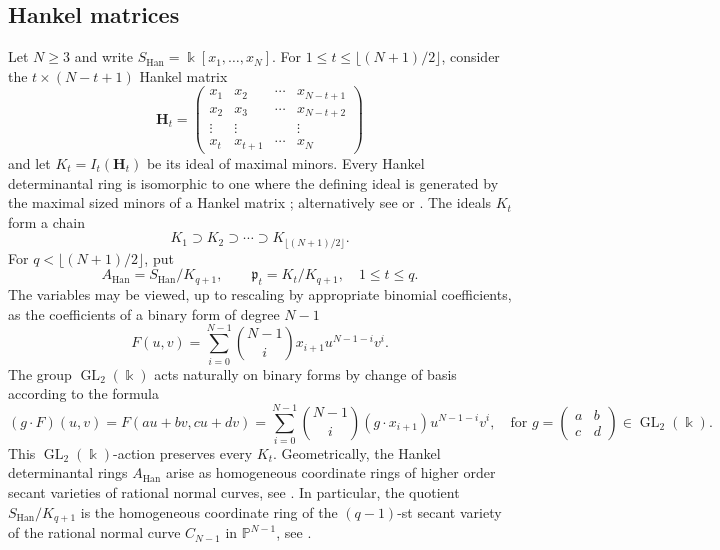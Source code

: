 \documentclass[11pt,reqno]{amsart}
\numberwithin{equation}{subsection}
\theoremstyle{definition}
\theoremstyle{remark}
\DeclareMathOperator{\GL}{GL}
\newcommand{\kfield}{\Bbbk}
\newcommand{\fp}{\mathfrak p}
\begin{document}
\subsection{Hankel matrices}

Let $N\ge3$ and write $S_{\mathrm{Han}}=\kfield[x_1,\ldots,x_N]$.  For
$1\le t\le\lfloor(N+1)/2\rfloor$, consider the $t\times(N-t+1)$ Hankel
matrix
\begin{equation}\label{eq:hankel-matrix}
 \mathbf H_t=
 \begin{pmatrix}
 x_1&x_2&\cdots&x_{N-t+1}\\
 x_2&x_3&\cdots&x_{N-t+2}\\
 \vdots&\vdots&&\vdots\\
 x_t&x_{t+1}&\cdots&x_N
 \end{pmatrix}
\end{equation}
and let $K_t=I_t(\mathbf H_t)$ be its ideal of maximal minors. Every Hankel determinantal ring
is isomorphic to one where the defining ideal is generated by the maximal sized
minors of a Hankel matrix \cite[Lemma 2.3]{GrusonPeskine1982}; alternatively see \cite[Proposition 7]{Watanabe1997Hankel} or \cite[Corollary 2.2(b)]{ConcaHankel}. The
ideals $K_t$ form a chain
\[
 K_1\supset K_2\supset\cdots\supset
 K_{\lfloor(N+1)/2\rfloor}.
\]
For $q<\lfloor(N+1)/2\rfloor$, put
\begin{equation}\label{eq:hankel-quotient}
 A_{\mathrm{Han}}=S_{\mathrm{Han}}/K_{q+1},
 \qquad
 \fp_t=K_t/K_{q+1},\quad1\le t\le q.
\end{equation}
The variables may be viewed, up to  rescaling by appropriate  binomial coefficients, as the
coefficients of a binary form of degree $N-1$ 
\[
F(u,v)
=
\sum_{i=0}^{N-1}\binom{N-1}{i}x_{i+1} u^{N-1-i}v^i.
\]
The group $\GL_2(\kfield)$ acts naturally on binary forms by change of basis according to the formula
\[
(g\cdot F)(u,v)
=
F(au+bv,cu+dv)=
\sum_{i=0}^{N-1}\binom{N-1}{i}(g\cdot x_{i+1})
u^{N-1-i}v^i,
 \quad \text{for } g=
\begin{pmatrix}
a&b\\
c&d
\end{pmatrix}
\in \GL_2(\kfield).
\]
This  $\GL_2(\kfield)$-action preserves every $K_t$. Geometrically, the Hankel determinantal rings $A_{\mathrm{Han}}$ arise as homogeneous coordinate rings of higher order secant varieties of rational
normal curves, see \cite[Chapter 11.7]{Room}. In particular, the quotient
$S_{\mathrm{Han}}/K_{q+1}$ is the homogeneous coordinate ring of the $(q-1)$-st secant variety of the rational normal curve $C_{N-1}$ in $\mathbb{P}^{N-1}$, see \cite[Section 4]{Eisenbud1988}. 
\end{document}
